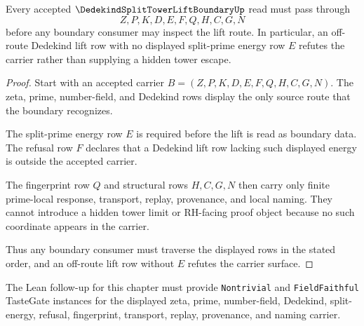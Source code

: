 \begin{theorem}
\label{thm:dedekind-split-tower-lift-boundary-nonescape}
Every accepted $\DedekindSplitTowerLiftBoundaryUp$ read must pass through
$$
Z,P,K,D,E,F,Q,H,C,G,N
$$
before any boundary consumer may inspect the lift route. In particular, an off-route Dedekind lift row with no displayed split-prime energy row $E$ refutes the carrier rather than supplying a hidden tower escape.
\end{theorem}
\begin{proof}
Start with an accepted carrier $B=(Z,P,K,D,E,F,Q,H,C,G,N)$. The zeta, prime, number-field, and Dedekind rows display the only source route that the boundary recognizes.

The split-prime energy row $E$ is required before the lift is read as boundary data. The refusal row $F$ declares that a Dedekind lift row lacking such displayed energy is outside the accepted carrier.

The fingerprint row $Q$ and structural rows $H,C,G,N$ then carry only finite prime-local response, transport, replay, provenance, and local naming. They cannot introduce a hidden tower limit or RH-facing proof object because no such coordinate appears in the carrier.

Thus any boundary consumer must traverse the displayed rows in the stated order, and an off-route lift row without $E$ refutes the carrier surface.
\end{proof}



The Lean follow-up for this chapter must provide \texttt{Nontrivial} and \texttt{FieldFaithful} TasteGate instances for the displayed zeta, prime, number-field, Dedekind, split-energy, refusal, fingerprint, transport, replay, provenance, and naming carrier.


